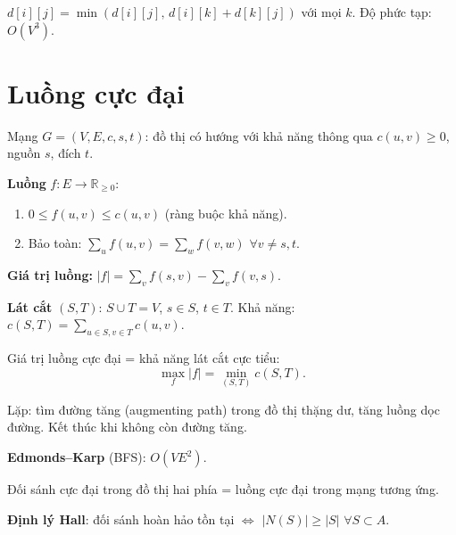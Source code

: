 \documentclass[12pt,a4paper]{article}
\begin{document}
\begin{phuongphap}[title={Floyd--Warshall (mọi cặp đỉnh)}]
  $d[i][j] = \min(d[i][j],\, d[i][k] + d[k][j])$ với mọi $k$. Độ phức tạp: $O(V^3)$.
\end{phuongphap}

\section{Luồng cực đại}

\begin{dinhnghia}[title={Mạng và luồng}]
  Mạng $G = (V, E, c, s, t)$: đồ thị có hướng với khả năng thông qua $c(u,v) \ge 0$, nguồn $s$, đích $t$.

  \textbf{Luồng} $f: E \to \mathbb{R}_{\ge 0}$:
  \begin{enumerate}
    \item $0 \le f(u,v) \le c(u,v)$ (ràng buộc khả năng).
    \item Bảo toàn: $\sum_u f(u,v) = \sum_w f(v,w)$ $\forall v \ne s, t$.
  \end{enumerate}
  \textbf{Giá trị luồng:} $|f| = \sum_v f(s,v) - \sum_v f(v,s)$.
\end{dinhnghia}

\begin{dinhnghia}[title={Lát cắt}]
  \textbf{Lát cắt} $(S, T)$: $S \cup T = V$, $s \in S$, $t \in T$. Khả năng: $c(S,T) = \sum_{u \in S, v \in T} c(u,v)$.
\end{dinhnghia}

\begin{dinhly}[title={Max-flow Min-cut}]
  Giá trị luồng cực đại = khả năng lát cắt cực tiểu:
  \[
    \max_f |f| = \min_{(S,T)} c(S, T).
  \]
\end{dinhly}

\begin{phuongphap}[title={Ford--Fulkerson}]
  Lặp: tìm đường tăng (augmenting path) trong đồ thị thặng dư, tăng luồng dọc đường. Kết thúc khi không còn đường tăng.

  \textbf{Edmonds--Karp} (BFS): $O(VE^2)$.
\end{phuongphap}

\begin{dinhly}[title={Đối sánh hai phía (bipartite matching)}]
  Đối sánh cực đại trong đồ thị hai phía = luồng cực đại trong mạng tương ứng.

  \textbf{Định lý Hall}: đối sánh hoàn hảo tồn tại $\Leftrightarrow$ $|N(S)| \ge |S|$ $\forall S \subset A$.
\end{dinhly}
\end{document}
